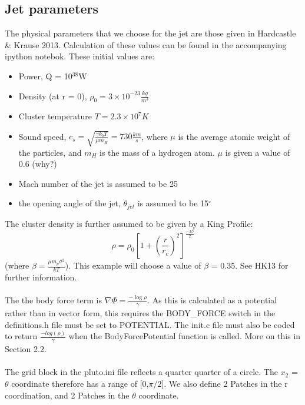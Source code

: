 \documentclass[12pt,a4paper]{report}
\begin{document}
\subsection{Jet parameters}
The physical parameters that we choose for the jet are those given in Hardcastle \& Krause 2013.  Calculation of these values can be found in the accompanying ipython notebok. These initial values are:
\begin{itemize}
	\item Power, Q = 10$^{38}$W
	\item Density (at r = 0), $\rho_0  = 3\times10^{-23}\frac{kg}{m^3}$
	\item Cluster temperature $T = 2.3\times10^7 K$	
	\item Sound speed, $c_s = \sqrt{\frac{\gamma k_b T}{\mu m_H}} = 730\frac{km}{s}$, where $\mu$ is the average atomic weight of the particles, and $m_H$ is the mass of a hydrogen atom. $\mu$ is given a value of 0.6 (why?)
	\item Mach number of the jet is assumed to be 25
	\item the opening angle of the jet, $\theta_{jet}$ is assumed to be 15$^{\circ}$
\end{itemize}
The cluster density is further assumed to be given by a King Profile:
\begin{equation}
\rho = \rho_0\left[ 1 + \left(\frac{r}{r_c}\right)^2 \right]^{\frac{-3\beta}{2}}
\end{equation}
(where $\beta = \frac{\mu m_p \sigma^2}{kT}$). This example will choose a value of $\beta$ = 0.35. See HK13 for further information.\\
\\
The the body force term is $\nabla \Phi = \frac{-\log{\rho}}{\gamma}$. As this is calculated as a potential rather than in vector form, this requires the BODY\_FORCE switch in the definitions.h file must be set to POTENTIAL. The init.c file must also be coded to return $\frac{-log(\rho)}{\gamma}$ when the BodyForcePotential function is called. More on this in Section 2.2.\\
\\
The grid block in the pluto.ini file reflects a quarter quarter of a circle. The $x_2$ = $\theta$ coordinate therefore has a range of [0,$\pi/2$]. We also define 2 Patches in the r coordination, and 2 Patches in the $\theta$ coordinate. 
\end{document}
